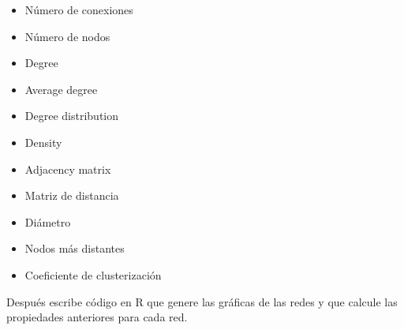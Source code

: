 \documentclass[
]{article}
\providecommand{\tightlist}{%
  \setlength{\itemsep}{0pt}\setlength{\parskip}{0pt}}
\begin{document}
\begin{itemize}
\tightlist
\item
  Número de conexiones
\item
  Número de nodos
\item
  Degree
\item
  Average degree
\item
  Degree distribution
\item
  Density
\item
  Adjacency matrix
\item
  Matriz de distancia
\item
  Diámetro
\item
  Nodos más distantes
\item
  Coeficiente de clusterización
\end{itemize}

Después escribe código en R que genere las gráficas de las redes y que
calcule las propiedades anteriores para cada red.
\end{document}
